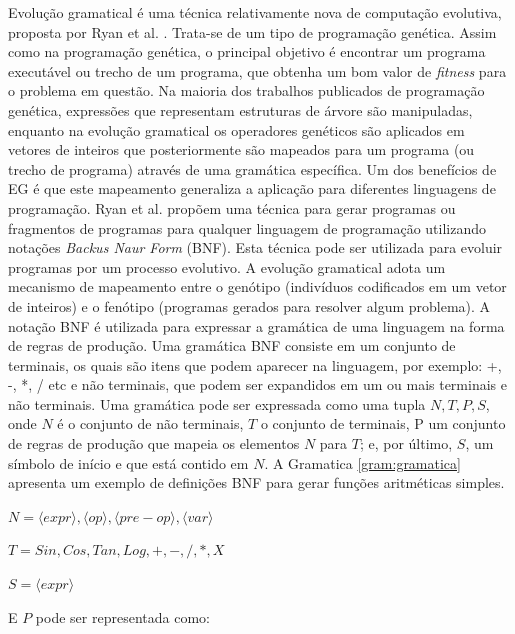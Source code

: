 Evolução gramatical é uma técnica relativamente nova de computação evolutiva, proposta por Ryan et al. \cite{ryan1998grammatical}. Trata-se de um tipo de programação genética. Assim como na programação genética, o principal objetivo é encontrar um programa executável ou trecho de um programa, que obtenha um bom valor de \textit{fitness} para o problema em questão. Na maioria dos trabalhos publicados de programação genética, expressões que representam estruturas de árvore são manipuladas, enquanto na evolução gramatical os operadores genéticos são aplicados em vetores de inteiros que posteriormente são mapeados para um programa (ou trecho de programa) através de uma gramática específica. Um dos benefícios de EG é que este mapeamento generaliza a aplicação para diferentes linguagens de programação. Ryan et al. \cite{ryan1998grammatical} propõem uma técnica para gerar programas ou fragmentos de programas para qualquer linguagem de programação utilizando notações \textit{Backus Naur Form} (BNF). Esta técnica pode ser utilizada para evoluir programas por um processo evolutivo. A evolução gramatical adota um mecanismo de mapeamento entre o genótipo (indivíduos codificados em um vetor de inteiros) e o fenótipo (programas gerados para resolver algum problema). 
A notação BNF é utilizada para expressar a gramática de uma linguagem na forma de regras de produção. Uma gramática BNF consiste em um conjunto de terminais, os quais são itens que podem aparecer na linguagem, por exemplo: +, -, *, / etc e não terminais, que podem ser expandidos em um ou mais terminais e não terminais. Uma gramática pode ser expressada como uma tupla ${N,T,P,S}$, onde $N$ é o conjunto de não terminais, $T$ o conjunto de terminais, P um conjunto de regras de produção que mapeia os elementos $N$ para $T$; e, por último, $S$, um símbolo de início e que está contido em $N$.
A Gramatica \ref{gram:gramatica} apresenta um exemplo de definições BNF para gerar funções aritméticas simples.

\begin{center}
	
	$ N = {\langle expr \rangle, \langle op \rangle, \langle pre-op \rangle}, \langle var \rangle$
	
	$ T = {Sin,Cos,Tan,Log,+,-,/,*,X} $
	
	$ S = \langle expr \rangle $
	
\end{center}

\noindent
E $P$ pode ser representada como:

